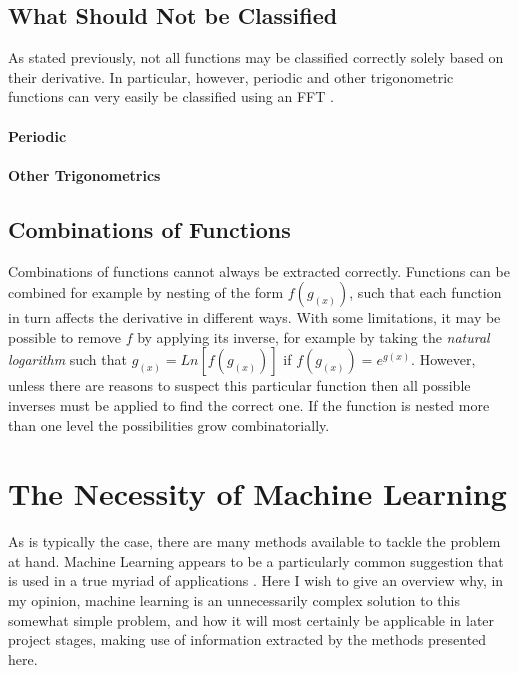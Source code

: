 \documentclass[main.tex]{subfiles}
\begin{document}
    \subsection{What Should Not be Classified}
      
      As stated previously, not all functions may be classified correctly solely based on their derivative. In particular, however, periodic and other trigonometric functions can very easily be classified using an FFT \cite{}.
      \paragraph{Periodic}
      \paragraph{Other Trigonometrics}
    
    \subsection{Combinations of Functions}
      Combinations of functions cannot always be extracted correctly. Functions can be combined for example by nesting of the form $f(g_{(x)})$, such that each function in turn affects the derivative in different ways. With some limitations, it may be possible to remove $f$ by applying its inverse, for example by taking the \textit{natural logarithm} such that $g_{(x)}=Ln\left [ f(g_{(x)})\right ]$ if $f(g_{(x)}) = e^{g(x)}$. However, unless there are reasons to suspect this particular function then all possible inverses must be applied to find the correct one. If the function is nested more than one level the possibilities grow combinatorially. 
      
      
    
  \section{The Necessity of Machine Learning}
  
    As is typically the case, there are many methods available to tackle the problem at hand. Machine Learning appears to be a particularly common suggestion that is used in a true myriad of applications \cite{}. Here I wish to give an overview why, in my opinion, machine learning is an unnecessarily complex solution to this somewhat simple problem, and how it will most certainly be applicable in later project stages, making use of information extracted by the methods presented here.
    
\end{document}
